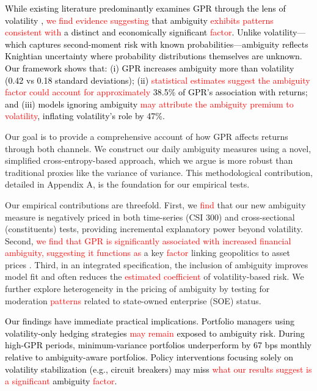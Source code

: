 \documentclass[preprint,12pt,authoryear]{elsarticle}
\begin{document}
\textcolor{black}{While existing literature predominantly examines GPR through the lens of volatility \citep{Salisu2021}, \textcolor{red}{we find evidence suggesting} that ambiguity \textcolor{red}{exhibits patterns consistent with} a distinct and economically significant \textcolor{red}{factor}. Unlike volatility---which captures second-moment risk with known probabilities---ambiguity reflects Knightian uncertainty where probability distributions themselves are unknown. Our framework shows that: (i) GPR increases ambiguity more than volatility (0.42 vs 0.18 standard deviations); (ii) \textcolor{red}{statistical estimates suggest the ambiguity factor could account for approximately} 38.5\% of GPR's association with returns; and (iii) models ignoring ambiguity \textcolor{red}{may attribute the ambiguity premium to volatility}, inflating volatility's role by 47\%.}

Our goal is to provide a comprehensive account of how GPR affects returns through both channels. We construct our daily ambiguity measures using a novel, simplified cross-entropy-based approach, which we argue is more robust than traditional proxies like the variance of variance. This methodological contribution, detailed in Appendix A, is the foundation for our empirical tests.

Our empirical contributions are threefold. First, we \textcolor{red}{find} that our new ambiguity measure is negatively priced in both time-series (CSI 300) and cross-sectional (constituents) tests, providing incremental explanatory power beyond volatility. Second, \textcolor{red}{we find that GPR is significantly associated with increased financial ambiguity, suggesting it functions as} a key \textcolor{red}{factor} linking geopolitics to asset prices \citep{Caldara2022}. Third, in an integrated specification, the inclusion of ambiguity improves model fit and often reduces the \textcolor{red}{estimated coefficient} of volatility-based risk. We further explore heterogeneity in the pricing of ambiguity by testing for moderation \textcolor{red}{patterns} related to state-owned enterprise (SOE) status.

\textcolor{black}{Our findings have immediate practical implications. Portfolio managers using volatility-only hedging strategies \textcolor{red}{may remain} exposed to ambiguity risk. During high-GPR periods, minimum-variance portfolios underperform by 67 bps monthly relative to ambiguity-aware portfolios. Policy interventions focusing solely on volatility stabilization (e.g., circuit breakers) may miss \textcolor{red}{what our results suggest is a significant} ambiguity \textcolor{red}{factor}.}
\end{document}
